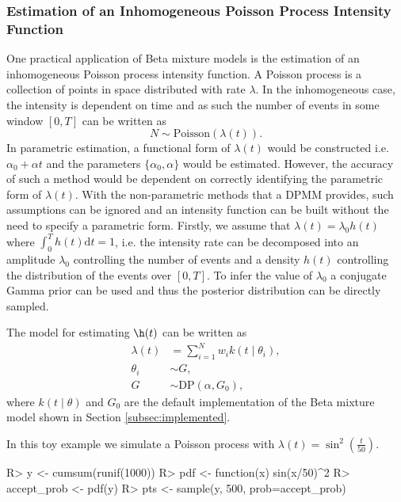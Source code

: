 \documentclass[nojss]{jss}
\begin{document}
\subsubsection{Estimation of an Inhomogeneous Poisson Process Intensity Function} \label{subsubsec:poisson}
One practical application of Beta mixture models is the estimation of an inhomogeneous Poisson process intensity function. A Poisson process is a collection of points in space distributed with rate $\lambda$. In the inhomogeneous case, the intensity is dependent on time and as such the number of events in some window $\left[0 , T\right]$ can be written as
\begin{equation}
N \sim \text{Poisson} (\lambda (t) ).
\end{equation}
In parametric estimation, a functional form of $\lambda (t)$ would be constructed i.e. $\alpha _0 + \alpha t$ and the parameters $\{\alpha _0, \alpha \}$ would be estimated. However, the accuracy of such a method would be dependent on correctly identifying the parametric form of $\lambda (t)$. With the non-parametric methods that a DPMM provides, such assumptions can be ignored and an intensity function can be built without the need to specify a parametric form. Firstly, we assume that $\lambda (t) = \lambda _0 h(t)$ where $\int _0 ^T h(t) \mathrm{d} t = 1$, i.e. the intensity rate can be decomposed into an amplitude $\lambda _0$ controlling the number of events and a density $h(t)$ controlling the distribution of the events over $\left[0 , T\right]$. To infer the value of $\lambda _0$ a conjugate Gamma prior can be used and thus the posterior distribution can be directly sampled.

The model for estimating $\h (t)$ can be written as
\begin{align*}
\lambda (t) & = \sum _{i=1} ^N w _i k(t \mid \theta _i ), \\
\theta _i & \sim G, \\
G & \sim \text{DP} ( \alpha , G_0),
\end{align*}
where $k(t \mid \theta )$ and $G_0$ are the default implementation of the Beta mixture model shown in Section \ref{subsec:implemented}.

In this toy example we simulate a Poisson process with $\lambda (t) = \sin ^2 \left( \frac{t}{50} \right)$.

\begin{Schunk}
\begin{Sinput}
R> y <- cumsum(runif(1000))
R> pdf <- function(x) sin(x/50)^2
R> accept_prob <- pdf(y)
R> pts <- sample(y, 500, prob=accept_prob)
\end{Sinput}
\end{Schunk}
\end{document}

